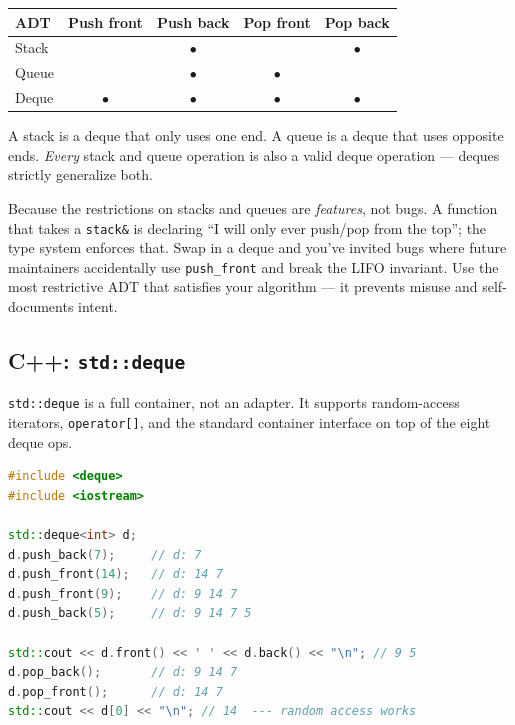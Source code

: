 \documentclass[11pt]{article}
\begin{document}
\begin{center}
\begin{tabular}{|l|c|c|c|c|}
\hline
\textbf{ADT} & \textbf{Push front} & \textbf{Push back} & \textbf{Pop front} & \textbf{Pop back} \\
\hline
Stack  &            &     $\bullet$     &             &     $\bullet$     \\
Queue  &            &     $\bullet$     &  $\bullet$ &                    \\
Deque  & $\bullet$ &     $\bullet$     &  $\bullet$ &     $\bullet$     \\
\hline
\end{tabular}
\end{center}

A stack is a deque that only uses one end. A queue is a deque that
uses opposite ends. \emph{Every} stack and queue operation is also
a valid deque operation --- deques strictly generalize both.

\begin{ideabox}
Because the restrictions on stacks and queues are \emph{features},
not bugs. A function that takes a \texttt{stack\&} is declaring
``I will only ever push/pop from the top''; the type system
enforces that. Swap in a deque and you've invited bugs where
future maintainers accidentally use \texttt{push\_front} and
break the LIFO invariant. Use the most restrictive ADT that
satisfies your algorithm --- it prevents misuse and
self-documents intent.
\end{ideabox}

\subsection*{C++: \texttt{std::deque}}

\texttt{std::deque} is a full container, not an adapter. It
supports random-access iterators, \texttt{operator[]}, and the
standard container interface on top of the eight deque ops.

\begin{examplebox}
\begin{lstlisting}[language=C++,basicstyle=\ttfamily\small,frame=single]
#include <deque>
#include <iostream>

std::deque<int> d;
d.push_back(7);     // d: 7
d.push_front(14);   // d: 14 7
d.push_front(9);    // d: 9 14 7
d.push_back(5);     // d: 9 14 7 5

std::cout << d.front() << ' ' << d.back() << "\n"; // 9 5
d.pop_back();       // d: 9 14 7
d.pop_front();      // d: 14 7
std::cout << d[0] << "\n"; // 14  --- random access works
\end{lstlisting}
\end{examplebox}
\end{document}
